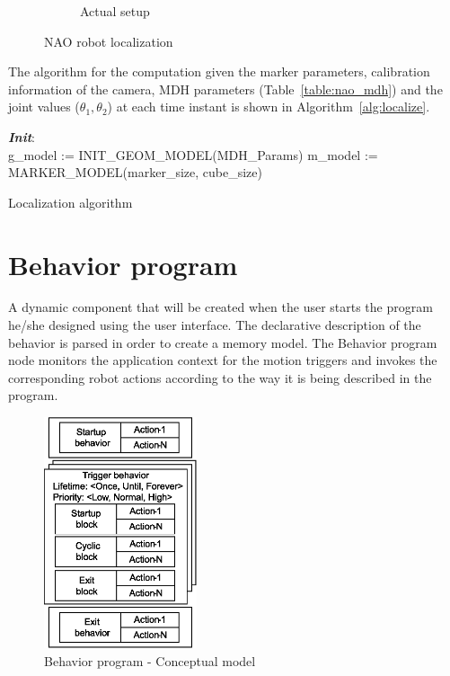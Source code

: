 \begin{figure}[H]
\begin{subfigure}[t]{0.48\textwidth}
\caption[Actual setup]{Actual setup}
\label{fig:localize_setup}
\end{subfigure}
\caption[NAO robot localization]{NAO robot localization}
\label{fig:nao_localization}
\end{figure}

The algorithm for the computation given the marker parameters, calibration information of the camera, MDH parameters (Table~\ref{table:nao_mdh}) and the joint values ($\theta_1,\theta_2$) at each time instant is shown in Algorithm~\ref{alg:localize}.

\begin{algorithm}[H]
 \textbf{\emph{Init}}:\\
 g\_model := INIT\_GEOM\_MODEL(MDH\_Params)\;
 m\_model := MARKER\_MODEL(marker\_size, cube\_size)\;
 \caption{Localization algorithm}
 \label{alg:localize}
\end{algorithm}
\section{Behavior program} 
\label{ssec:behavior_program}
A dynamic component that will be created when the user starts the program he/she designed using the user interface. The declarative description of the behavior is parsed in order to create a memory model. The Behavior program node monitors the application context for the motion triggers and invokes the corresponding robot actions according to the way it is being described in the program.
\begin{figure}
\centering
\includegraphics[width=0.4\textwidth]{../thesis/assets/program_structure.eps}
\caption[Behavior program - Conceptual model]{Behavior program - Conceptual model}
\label{fig:program_concept}
\end{figure}
